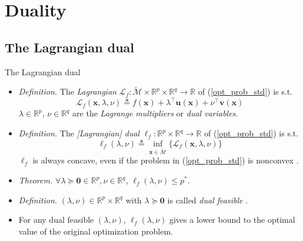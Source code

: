 \documentclass{beamer}
\numberwithin{equation}{section}
\newcommand{\aref}[1]{\alert{\ref{#1}}}
\begin{document}
\section{Duality}

\subsection{The Lagrangian dual}

\begin{frame}{The Lagrangian dual}
    \begin{itemize}
        \item
        \textit{Definition.} The \textit{Lagrangian} $ \mathcal{L}_f :
        \tilde{\mathcal{M}} \times \mathbb{R}^p \times \mathbb{R}^q \rightarrow
        \mathbb{R} $ of (\aref{opt_prob_std}) is s.t.
        \begin{equation} \label{std_lagrangian}
            \mathcal{L}_f(\mathbf{x}, \lambda, \nu) \triangleq f(\mathbf{x}) +
            \lambda^\top\mathbf{u}(\mathbf{x}) + \nu^\top\mathbf{v}(\mathbf{x})
        \end{equation}
        $ \lambda \in \mathbb{R}^p $, $ \nu \in \mathbb{R}^q $ are the
        \textit{Lagrange multipliers} or \textit{dual variables}.

        \item
        \textit{Definition.} The \textit{[Lagrangian] dual} $ \ell_f :
        \mathbb{R}^p \times \mathbb{R}^q \rightarrow \mathbb{R} $ of 
        (\aref{opt_prob_std}) is s.t.
        \begin{equation} \label{std_dual}
            \ell_f(\lambda, \nu) \triangleq
            \inf_{\mathbf{x} \in \tilde{\mathcal{M}}}
            \{\mathcal{L}_f(\mathbf{x}, \lambda, \nu)\}
        \end{equation}
        $ \ell_f $ is always concave, even if the problem in
        (\aref{opt_prob_std}) is nonconvex \cite{bv_convex_opt}.

        \item
        \textit{Theorem.} $ \forall \lambda \succeq \mathbf{0} \in
        \mathbb{R}^p, \nu \in \mathbb{R}^q $, $ \ell_f(\lambda, \nu) \le p^* $.

        \item
        \textit{Definition.} $ (\lambda, \nu) \in \mathbb{R}^p \times
        \mathbb{R}^q $ with $ \lambda \succeq \mathbf{0} $ is called
        \textit{dual feasible} \cite{bv_convex_opt}.

        \item
        For any dual feasible $ (\lambda, \nu) $, $ \ell_f(\lambda, \nu) $
        gives a lower bound to the optimal value of the original optimization
        problem.
    \end{itemize}
\end{frame}
\end{document}
